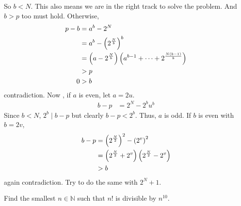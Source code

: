 \begin{solution}
	So $b<N$. This also means we are in the right track to solve the problem. And $b>p$ too must hold. Otherwise,
		\begin{align*}
			p-b & = a^b-2^N\\
				& = a^b-\left(2^{\frac{N}{b}}\right)^b\\
				& = \left(a-2^{\frac{N}{b}}\right)\left(a^{b-1}+\cdots+2^{\frac{N(b-1)}{b}}\right)\\
				& > p\\
			0	& > b
		\end{align*}
	contradiction.  Now , if $a$ is even, let $a=2u$.
		\begin{align*}
			b-p & = 2^N-2^bu^b
		\end{align*}
	Since $b<N$, $2^b\mid b-p$ but clearly $b-p<2^b$. Thus, $a$ is odd. If $b$ is even with $b=2v$,
		\begin{align*}
			b-p & = \left(2^{\frac{N}{2}}\right)^2-\left(2^v\right)^2\\
				& = \left(2^{\frac{N}{2}}+2^v\right)\left(2^{\frac{N}{2}}-2^v\right)\\
				& > b
		\end{align*}
	again contradiction. Try to do the same with $2^N+1$.
\end{solution}

\begin{problem}[Columbia $2010$]
	Find the smallest $n\in\mathbb{N}$ such that $n!$ is divisible by $n^{10}$.
\end{problem}

